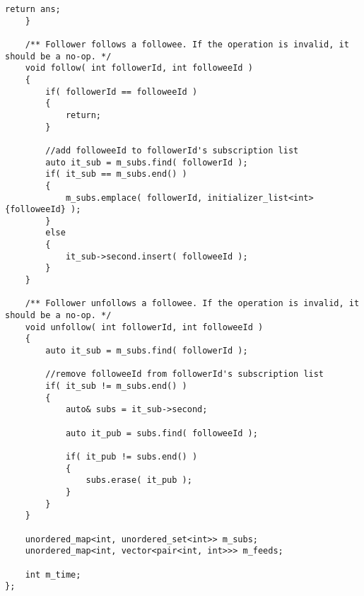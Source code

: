 \begin{lstlisting}[style=customc, caption={Priority Queue}]
        return ans;
    }

    /** Follower follows a followee. If the operation is invalid, it should be a no-op. */
    void follow( int followerId, int followeeId )
    {
        if( followerId == followeeId )
        {
            return;
        }

        //add followeeId to followerId's subscription list
        auto it_sub = m_subs.find( followerId );
        if( it_sub == m_subs.end() )
        {
            m_subs.emplace( followerId, initializer_list<int> {followeeId} );
        }
        else
        {
            it_sub->second.insert( followeeId );
        }
    }

    /** Follower unfollows a followee. If the operation is invalid, it should be a no-op. */
    void unfollow( int followerId, int followeeId )
    {
        auto it_sub = m_subs.find( followerId );

        //remove followeeId from followerId's subscription list
        if( it_sub != m_subs.end() )
        {
            auto& subs = it_sub->second;

            auto it_pub = subs.find( followeeId );

            if( it_pub != subs.end() )
            {
                subs.erase( it_pub );
            }
        }
    }

    unordered_map<int, unordered_set<int>> m_subs;
    unordered_map<int, vector<pair<int, int>>> m_feeds;

    int m_time;
};
\end{lstlisting}
